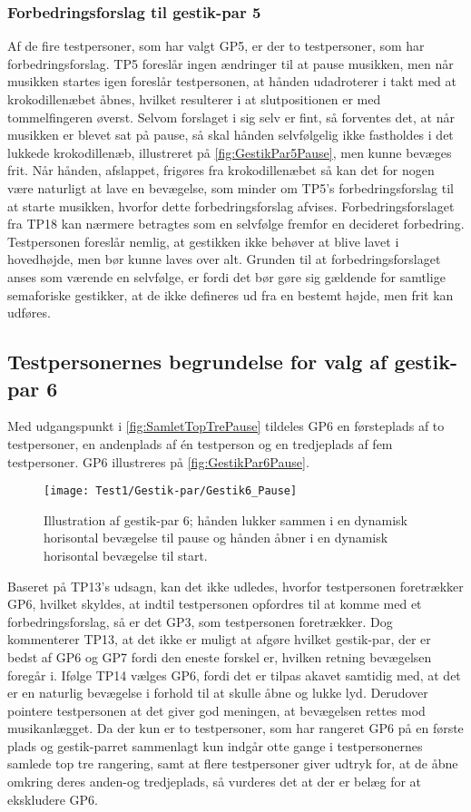 \subsubsection{Forbedringsforslag til gestik-par 5}
\label{TestresultaterValgAfGestikkerForbedringGP5}
%
Af de fire testpersoner, som har valgt GP5, er der to testpersoner, som har forbedringsforslag. TP5 foreslår ingen ændringer til at pause musikken, men når musikken startes igen foreslår testpersonen, at hånden udadroterer i takt med at krokodillenæbet åbnes, hvilket resulterer i at slutpositionen er med tommelfingeren øverst. Selvom forslaget i sig selv er fint, så forventes det, at når musikken er blevet sat på pause, så skal hånden selvfølgelig ikke fastholdes i det lukkede krokodillenæb, illustreret på \autoref{fig:GestikPar5Pause}, men kunne bevæges frit. Når hånden, afslappet, frigøres fra krokodillenæbet så kan det for nogen være naturligt at lave en bevægelse, som minder om TP5's forbedringsforslag til at starte musikken, hvorfor dette forbedringsforslag afvises. Forbedringsforslaget fra TP18 kan nærmere betragtes som en selvfølge fremfor en decideret forbedring. Testpersonen foreslår nemlig, at gestikken ikke behøver at blive lavet i hovedhøjde, men bør kunne laves over alt. Grunden til at forbedringsforslaget anses som værende en selvfølge, er fordi det bør gøre sig gældende for samtlige semaforiske gestikker, at de ikke defineres ud fra en bestemt højde, men frit kan udføres.
%
\subsection{Testpersonernes begrundelse for valg af gestik-par 6}
\label{TestresultaterValgAfGestikkerBegrundelseGP6}
%
Med udgangspunkt i \autoref{fig:SamletTopTrePause} tildeles GP6 en førsteplads af to testpersoner, en andenplads af én testperson og en tredjeplads af fem testpersoner. GP6 illustreres på \autoref{fig:GestikPar6Pause}.
%
\begin{figure}[H]
	\centering
	\texttt{[image: Test1/Gestik-par/Gestik6\_Pause]}
	\caption{Illustration af gestik-par 6; hånden lukker sammen i en dynamisk horisontal bevægelse til pause og hånden åbner i en dynamisk horisontal bevægelse til start.}
	\label{fig:GestikPar6Pause}
\end{figure}
\noindent
%
Baseret på TP13's udsagn, kan det ikke udledes, hvorfor testpersonen foretrækker GP6, hvilket skyldes, at indtil testpersonen opfordres til at komme med et forbedringsforslag, så er det GP3, som testpersonen foretrækker. Dog kommenterer TP13, at det ikke er muligt at afgøre hvilket gestik-par, der er bedst af GP6 og GP7 fordi den eneste forskel er, hvilken retning bevægelsen foregår i. Ifølge TP14 vælges GP6, fordi det er tilpas akavet samtidig med, at det er en naturlig bevægelse i forhold til at skulle åbne og lukke lyd. Derudover pointere testpersonen at det giver god meningen, at bevægelsen rettes mod musikanlægget. Da der kun er to testpersoner, som har rangeret GP6 på en første plads og gestik-parret sammenlagt kun indgår otte gange i testpersonernes samlede top tre rangering, samt at flere testpersoner giver udtryk for, at de åbne omkring deres anden-og tredjeplads, så vurderes det at der er belæg for at ekskludere GP6. 
%
